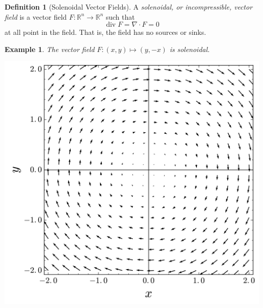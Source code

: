 \documentclass{article}
\DeclareMathOperator{\Div}{div}
\newtheorem{example}{Example}[section]
\theoremstyle{remark}
\theoremstyle{definition}
\newtheorem{definition}{Definition}[section]
\begin{document}
\begin{definition}[Solenoidal Vector Fields]
A \textit{solenoidal, or incompressible, vector field} is a vector field $F: \mathbb{R}^n \longrightarrow \mathbb{R}^n$ such that
\[\Div F = \nabla \cdot F = 0\]
at all point in the field. That is, the field has no sources or sinks. 
\end{definition}

\begin{example}
The vector field $F: (x, y) \mapsto (y, -x)$ is solenoidal. 
\begin{center}
    \includegraphics[scale=0.17]{img/Solenoidal_vector_field.png}
\end{center}
\end{example}
\end{document}
